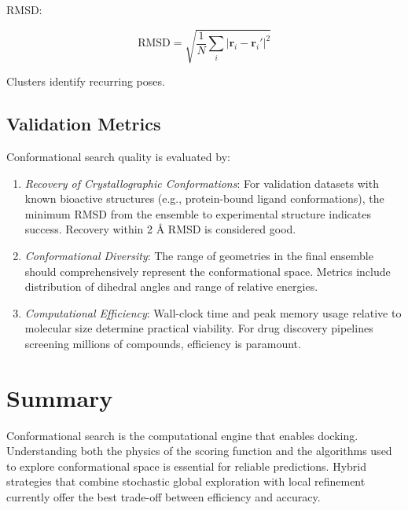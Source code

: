 \documentclass[12pt]{article}
\begin{document}
RMSD:

\[
\text{RMSD} = \sqrt{\frac{1}{N} \sum_i |\mathbf{r}_i - \mathbf{r}_i'|^2}
\]

Clusters identify recurring poses.

\subsection{Validation Metrics}

Conformational search quality is evaluated by:

\begin{enumerate}
\item \textit{Recovery of Crystallographic Conformations}: For validation datasets with known bioactive structures (e.g., protein-bound ligand conformations), the minimum RMSD from the ensemble to experimental structure indicates success. Recovery within 2 \r{A} RMSD is considered good.

\item \textit{Conformational Diversity}: The range of geometries in the final ensemble should comprehensively represent the conformational space. Metrics include distribution of dihedral angles and range of relative energies.

\item \textit{Computational Efficiency}: Wall-clock time and peak memory usage relative to molecular size determine practical viability. For drug discovery pipelines screening millions of compounds, efficiency is paramount.
\end{enumerate}

\section{Summary}
Conformational search is the computational engine that enables docking. Understanding both the physics of the scoring function and the algorithms used to explore conformational space is essential for reliable predictions. Hybrid strategies that combine stochastic global exploration with local refinement currently offer the best trade-off between efficiency and accuracy.




\end{document}
